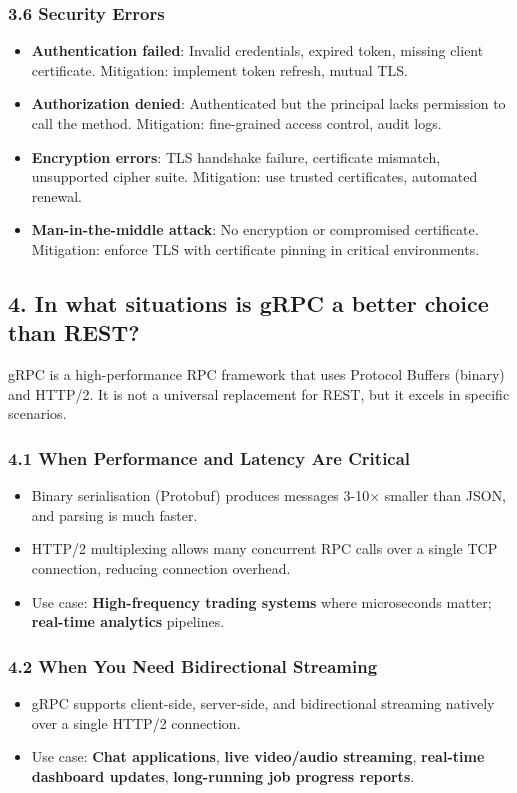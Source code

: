 \documentclass[10pt,a4paper]{article}
\begin{document}
\subsubsection{3.6 Security Errors}
\begin{itemize}
    \item \textbf{Authentication failed}: Invalid credentials, expired token, missing client certificate. Mitigation: implement token refresh, mutual TLS.
    \item \textbf{Authorization denied}: Authenticated but the principal lacks permission to call the method. Mitigation: fine-grained access control, audit logs.
    \item \textbf{Encryption errors}: TLS handshake failure, certificate mismatch, unsupported cipher suite. Mitigation: use trusted certificates, automated renewal.
    \item \textbf{Man-in-the-middle attack}: No encryption or compromised certificate. Mitigation: enforce TLS with certificate pinning in critical environments.
\end{itemize}

\subsection{4. In what situations is gRPC a better choice than REST?}

gRPC is a high-performance RPC framework that uses Protocol Buffers (binary) and HTTP/2. It is not a universal replacement for REST, but it excels in specific scenarios.

\subsubsection{4.1 When Performance and Latency Are Critical}
\begin{itemize}
    \item Binary serialisation (Protobuf) produces messages 3-10× smaller than JSON, and parsing is much faster.
    \item HTTP/2 multiplexing allows many concurrent RPC calls over a single TCP connection, reducing connection overhead.
    \item Use case: \textbf{High-frequency trading systems} where microseconds matter; \textbf{real-time analytics} pipelines.
\end{itemize}

\subsubsection{4.2 When You Need Bidirectional Streaming}
\begin{itemize}
    \item gRPC supports client-side, server-side, and bidirectional streaming natively over a single HTTP/2 connection.
    \item Use case: \textbf{Chat applications}, \textbf{live video/audio streaming}, \textbf{real-time dashboard updates}, \textbf{long-running job progress reports}.
\end{itemize}
\end{document}
